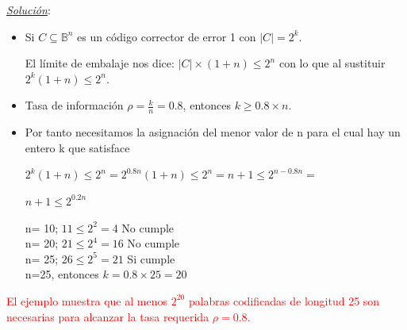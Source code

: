 \documentclass{beamer}
\theoremstyle{plain}
\theoremstyle{example}
\theoremstyle{example}
\begin{document}
\begin{frame}  \small  

\textit{\underline{Solución}}:\\

\begin{itemize}

\item Si $C\subseteq \mathbb{B}^n$ es un código corrector de error 1 con $|C| = 2^k$.

El límite de embalaje nos dice:  $ |C| \times (1 + n ) \leq 2^n $	con lo que al sustituir  $2^k (1 + n) \leq 2^n$. 

\item Tasa de información $ \rho  = \frac{k}{n} = 0.8$, entonces $k \geq  0.8 \times n$. 

\item Por tanto necesitamos la asignación del menor valor de n para el cual hay un entero k que satisface 

\begin{center}

$2^k (1 + n) \leq 2^n = 2^{0.8n} (1 + n) \leq 2^n = n+1 \leq 2^{n-0.8 n} =  $	 
\vspace{0.3cm}

$n+1 \leq 2^{0.2 n} $	 
\vspace{0.2cm}

n= 10; $11 \leq 2^2=4  $ No cumple\\
n= 20; $21 \leq 2^4=16 $ No cumple\\
n= 25; $26 \leq 2^5=21 $ Si cumple\\
\vspace{0.3cm}
n=25, entonces $k = 0.8 \times 25 = 20$

\end{center}


\end{itemize}

\textcolor{red}{El ejemplo muestra que al menos $2^{20}$ palabras codificadas de longitud 25 son necesarias para alcanzar la tasa requerida $\rho=0.8$.}



\end{frame} 
\end{document}
